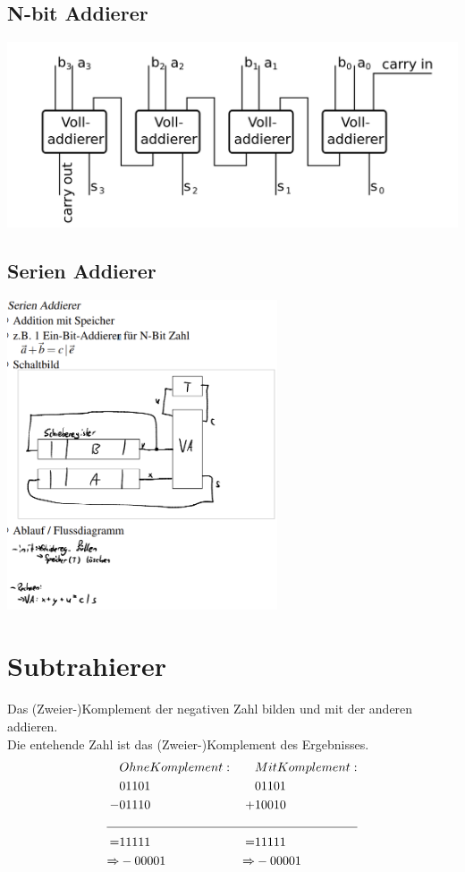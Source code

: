 \documentclass[12pt,a4paper]{article}
\begin{document}
	\subsection{N-bit Addierer}
	\includegraphics[width=\textwidth]{Bilder/nbitaddierer.png}

	\subsection{Serien Addierer}
	\includegraphics[width=0.6\textwidth]{Bilder/serien_addierer.PNG}

\section{Subtrahierer}
	Das (Zweier-)Komplement der negativen Zahl bilden und mit der anderen addieren.\\
	Die entehende Zahl ist das (Zweier-)Komplement des Ergebnisses.
	\begin{align*}
		&Ohne Komplement:&&Mit Komplement:\\
		&01101 &  &01101\\
		-&01110 & +&10010\\
		\cline{1-4}
		=&11111 & =&11111\\
		\Rightarrow&-00001&\Rightarrow&-00001
	\end{align*}
	
\end{document}
